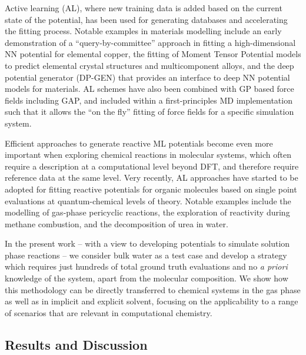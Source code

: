 \documentclass[../../main.tex]{subfiles}
\begin{document}
Active learning (AL), where new training data is added based on the current state of the potential, has been used for generating databases and accelerating the fitting process.\cite{Sivaraman2020, Podryabinkin2019, Artrith2012, Gubaev2019, Yang2021, Smith2018} Notable examples in materials modelling include an early demonstration of a “query-by-committee” approach in fitting a high-dimensional NN potential for elemental copper,\cite{Artrith2012} the fitting of Moment Tensor Potential\cite{Shapeev2016} models\cite{Podryabinkin2017} to predict elemental crystal structures\cite{Podryabinkin2019} and multicomponent alloys,\cite{Gubaev2019} and the deep potential generator (DP-GEN)\cite{Zhang2019, Zhang2020dpgen} that provides an interface to deep NN potential models for materials.\cite{Zhang2018} AL schemes have also been combined with GP based force fields including GAP,\cite{Vandermause2020} and included within a first-principles MD implementation such that it allows the “on the fly” fitting of force fields for a specific simulation system.\cite{Jinnouchi2019, Jinnouchi2020}

Efficient approaches to generate reactive ML potentials become even more important when exploring chemical reactions in molecular systems, which often require a description at a computational level beyond DFT, and therefore require reference data at the same level. Very recently, AL approaches have started to be adopted for fitting reactive potentials for organic molecules based on single point evaluations at quantum-chemical levels of theory. Notable examples include the modelling of gas-phase pericyclic reactions,\cite{Ang2021} the exploration of reactivity during methane combustion,\cite{Zeng2020} and the decomposition of urea in water.\cite{Yang2021}

In the present work – with a view to developing potentials to simulate solution phase reactions – we consider bulk water as a test case and develop a strategy which requires just hundreds of total ground truth evaluations and no \emph{a priori} knowledge of the system, apart from the molecular composition. We show how this methodology can be directly transferred to chemical systems in the gas phase as well as in implicit and explicit solvent, focusing on the applicability to a range of scenarios that are relevant in computational chemistry.


\subsection{Results and Discussion}
\end{document}
